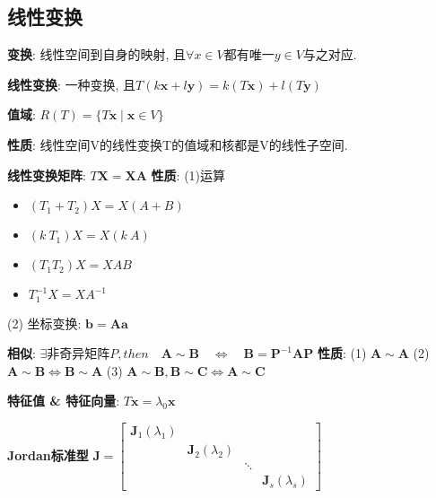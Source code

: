 \documentclass{article}
\begin{document}
        
    \subsection{线性变换}
        \textbf{变换}: 线性空间到自身的映射, 且$\forall x \in V$都有唯一$y \in V$与之对应.

        \textbf{线性变换}: 一种变换, 且$T(k \boldsymbol{x}+l \boldsymbol{y})=k(T \boldsymbol{x})+l(T \boldsymbol{y})$

        \textbf{值域}: $R(T)=\{T \boldsymbol{x} \mid \boldsymbol{x} \in V\}$

            \textbf{性质}: 线性空间V的线性变换T的值域和核都是V的线性子空间.

        \textbf{线性变换矩阵}: $T \boldsymbol X = \boldsymbol X \boldsymbol A$ 
            \textbf{性质}: 
            (1)运算
                \begin{itemize}
                    \item $(T_1 + T_2) X = X (A + B)$
                    \item $(k\ T_1) X = X (k\ A)$
                    \item $(T_1 T_2) X = X AB$
                    \item $T_1^{-1} X = X A^{-1}$
                \end{itemize}
            (2) 坐标变换: $\boldsymbol b = \boldsymbol A \boldsymbol a$

        \textbf{相似}: $\exists \text{非奇异矩阵}P, then \quad \boldsymbol A \sim \boldsymbol B \quad \Leftrightarrow \quad \boldsymbol B = \boldsymbol P^{-1} \boldsymbol A \boldsymbol P$
            \textbf{性质}: 
            (1) $\boldsymbol A \sim \boldsymbol A$ 
            (2) $\boldsymbol A \sim \boldsymbol B \Leftrightarrow \boldsymbol B \sim \boldsymbol A$ 
            (3) $\boldsymbol A \sim \boldsymbol B, \boldsymbol B \sim \boldsymbol C \Leftrightarrow \boldsymbol A \sim \boldsymbol C$

        \textbf{特征值 \& 特征向量}: $T \boldsymbol x = \lambda_0 \boldsymbol x$
        

        \textbf{Jordan标准型}
            $\boldsymbol{J}=\left[\begin{array}{llll}
                \boldsymbol{J}_{1}\left(\lambda_{1}\right) & & & \\
                & \boldsymbol{J}_{2}\left(\lambda_{2}\right) & & \\
                & & \ddots & \\
                & & & \boldsymbol{J}_{s}\left(\lambda_{s}\right)
                \end{array}\right]$
\end{document}
